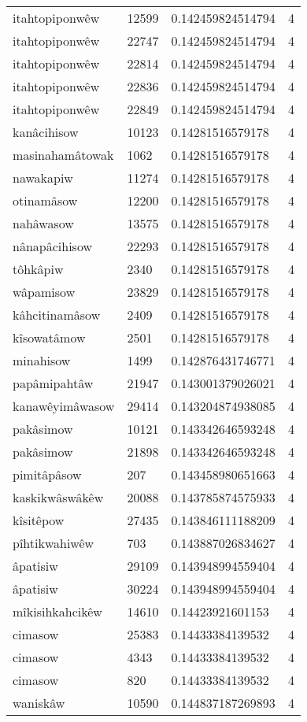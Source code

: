 \begin{longtable}{llll}
itahtopiponwêw & 12599 & 0.142459824514794 & 4 \\
itahtopiponwêw & 22747 & 0.142459824514794 & 4 \\
itahtopiponwêw & 22814 & 0.142459824514794 & 4 \\
itahtopiponwêw & 22836 & 0.142459824514794 & 4 \\
itahtopiponwêw & 22849 & 0.142459824514794 & 4 \\
kanâcihisow & 10123 & 0.14281516579178 & 4 \\
masinahamâtowak & 1062 & 0.14281516579178 & 4 \\
nawakapiw & 11274 & 0.14281516579178 & 4 \\
otinamâsow & 12200 & 0.14281516579178 & 4 \\
nahâwasow & 13575 & 0.14281516579178 & 4 \\
nânapâcihisow & 22293 & 0.14281516579178 & 4 \\
tôhkâpiw & 2340 & 0.14281516579178 & 4 \\
wâpamisow & 23829 & 0.14281516579178 & 4 \\
kâhcitinamâsow & 2409 & 0.14281516579178 & 4 \\
kîsowatâmow & 2501 & 0.14281516579178 & 4 \\
minahisow & 1499 & 0.142876431746771 & 4 \\
papâmipahtâw & 21947 & 0.143001379026021 & 4 \\
kanawêyimâwasow & 29414 & 0.143204874938085 & 4 \\
pakâsimow & 10121 & 0.143342646593248 & 4 \\
pakâsimow & 21898 & 0.143342646593248 & 4 \\
pimitâpâsow & 207 & 0.143458980651663 & 4 \\
kaskikwâswâkêw & 20088 & 0.143785874575933 & 4 \\
kîsitêpow & 27435 & 0.143846111188209 & 4 \\
pîhtikwahiwêw & 703 & 0.143887026834627 & 4 \\
âpatisiw & 29109 & 0.143948994559404 & 4 \\
âpatisiw & 30224 & 0.143948994559404 & 4 \\
mîkisihkahcikêw & 14610 & 0.14423921601153 & 4 \\
cimasow & 25383 & 0.14433384139532 & 4 \\
cimasow & 4343 & 0.14433384139532 & 4 \\
cimasow & 820 & 0.14433384139532 & 4 \\
waniskâw & 10590 & 0.144837187269893 & 4 \\

\end{longtable}
